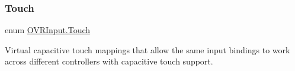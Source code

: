\mbox{\label{class_o_v_r_input_a4e1f1eb856223383aefc1965dd2db39a}} 
\subsubsection{\texorpdfstring{Touch}{Touch}}
{\footnotesize\ttfamily enum \mbox{\hyperlink{class_o_v_r_input_a4e1f1eb856223383aefc1965dd2db39a}{O\+V\+R\+Input.\+Touch}}\hspace{0.3cm}{\ttfamily [strong]}}



Virtual capacitive touch mappings that allow the same input bindings to work across different controllers with capacitive touch support. 

